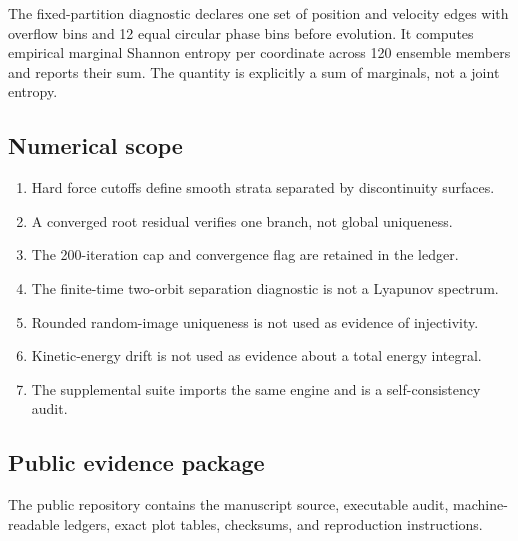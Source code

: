 The fixed-partition diagnostic declares one set of position and velocity edges with overflow bins and 12 equal circular phase bins before evolution. It computes empirical marginal Shannon entropy per coordinate across 120 ensemble members and reports their sum. The quantity is explicitly a sum of marginals, not a joint entropy.

\subsection{Numerical scope}

\begin{enumerate}
\item Hard force cutoffs define smooth strata separated by discontinuity surfaces.
\item A converged root residual verifies one branch, not global uniqueness.
\item The 200-iteration cap and convergence flag are retained in the ledger.
\item The finite-time two-orbit separation diagnostic is not a Lyapunov spectrum.
\item Rounded random-image uniqueness is not used as evidence of injectivity.
\item Kinetic-energy drift is not used as evidence about a total energy integral.
\item The supplemental suite imports the same engine and is a self-consistency audit.
\end{enumerate}

\subsection{Public evidence package}

The public repository contains the manuscript source, executable audit, machine-readable ledgers, exact plot tables, checksums, and reproduction instructions.
